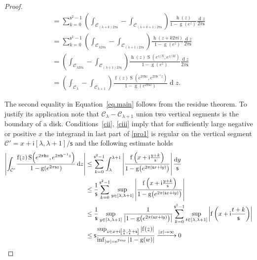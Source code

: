 \documentclass[12pt]{amsart}
\theoremstyle{definition}
\def\calC{\mathcal C}
\newcommand{\im}{\mathsf{i}}
\begin{document}
\begin{proof}
\begin{multline}
=\sum_{k=0}^{\mathsf{s}^2-1}\left(\int_{\mathcal{C}_{(\lambda +k)2\pi\mathsf{s}}}
-\int_{\mathcal{C}_{(\lambda+k+1) 2\pi\mathsf{s}}}\right)
\frac{\operatorname{h}(z)}{1-\operatorname{g}\!\left(e^{z}\right)}
\frac{\operatorname{d}\!z}{2\pi\mathsf{s}} \\
=\sum_{k=0}^{\mathsf{s}^2-1}\left(\int_{\mathcal{C}_{\lambda 2\pi\mathsf{s}}}
-\int_{\mathcal{C}_{(\lambda+1) 2\pi\mathsf{s}}}\right)
\frac{\operatorname{h}(z+k2\pi\im)}{1-\operatorname{g}\!
\left(e^{z}\right)}\frac{\operatorname{d}\!z}{2\pi\mathsf{s}} \\
=\left(\int_{\mathcal{C}_{\lambda 2\pi\mathsf{s}}}-
\int_{\mathcal{C}_{(\lambda+1) 2\pi\mathsf{s}}}\right)
\frac{\operatorname{h}(z)\operatorname{S}\!
\left(e^{z/N},e^{z/M}\right)}{1-\operatorname{g}\!\left(e^{z}\right)}
\frac{\operatorname{d}\!z}{2\pi\mathsf{s}} \\
=\left(\int_{\mathcal{C}_{\lambda}}-\int_{\mathcal{C}_{\lambda+1}}\right)
\frac{\operatorname{f}(z)\operatorname{S}\!
\left(e^{2\pi\mathsf{b}z},e^{2\pi\mathsf{b}^{-1}z}\right)}{1-\operatorname{g}\!
\left(e^{2\pi\mathsf{s}z}\right)}\operatorname{d}\!z.
\end{multline}

The second equality in Equation~\eqref{eq.main} follows from the residue 
theorem. To justify its application note that $\mathcal{C}_{\lambda}-
\mathcal{C}_{\lambda+1}$ union two vertical segments is the boundary of a disk.
Conditions~\eqref{cii}, 
\eqref{ciii} imply that for sufficiently large  negative or positive $x$ 
the integrand in last part of \eqref{pro1} is regular on the vertical segment 
$\calC'= x+\im[\lambda,\lambda+1]/\mathsf{s}$ and the following estimate holds 
\begin{align*}
\left|\int_{\calC'}{\operatorname{f}(z)\operatorname{S}\!
\left(e^{2\pi\mathsf{b}z},e^{2\pi\mathsf{b}^{-1}z}\right)\over 1-\operatorname{g}\!
\left(e^{2\pi\mathsf{s}z}\right)}\operatorname{d}\!z\right|
 & \le
\sum_{k=0}^{\mathsf{s}^2-1}\int_{\lambda}^{\lambda+1}
\left |{\operatorname{f}\left(x+\im {y+k\over\mathsf{s}}\right)\over1-\operatorname{g}\!
\left(e^{2\pi(\mathsf{s}x+\im y)}\right)} \right |{\operatorname{d}\!y\over \mathsf{s}}\\
 & \le
{1\over\mathsf{s}}\sum_{k=0}^{\mathsf{s}^2-1}
\sup_{y\in [\lambda,\lambda+1]}\left |{\operatorname{f}\left(x+\im {y+k\over\mathsf{s}}\right)\over1-\operatorname{g}\!
\left(e^{2\pi(\mathsf{s}x+\im y)}\right)} \right |\\
& \le
{1\over\mathsf{s}}\sup_{y\in [\lambda,\lambda+1]}{1\over\left|1-\operatorname{g}\!
\left(e^{2\pi(\mathsf{s}x+\im y)}\right) \right |} 
\sum_{k=0}^{\mathsf{s}^2-1}
\sup_{t\in [\lambda,\lambda+1]}\left |\operatorname{f}\left(x+\im {t+k\over\mathsf{s}}\right)\right| \\
& \le\mathsf{s}{\sup_{z\in x+\im\left[{\lambda\over\mathsf{s}},{\lambda\over\mathsf{s}}+\mathsf{s}\right]}\left|\operatorname{f}(z)\right|\over\inf_{|w|=e^{2\pi\mathsf{s}x}}\left|1-\operatorname{g}\!
\left(w\right) \right |}
\xrightarrow{|x|\to\infty} 0
\end{align*}
\end{proof}
\end{document}
